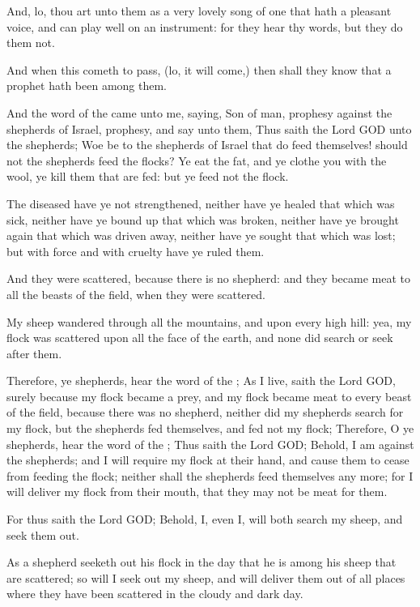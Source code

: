 \Verse And, lo, thou art unto them as a very lovely song of one that hath a pleasant voice, and can play well on an instrument: for they hear thy words, but they do them not.

\Verse And when this cometh to pass, (lo, it will come,) then shall they know that a prophet hath been among them.


\Chapter
\Verse And the word of the \LORD came unto me, saying, \Verse Son of man, prophesy against the shepherds of Israel, prophesy, and say unto them, Thus saith the Lord GOD unto the shepherds; Woe be to the shepherds of Israel that do feed themselves! should not the shepherds feed the flocks?  \Verse Ye eat the fat, and ye clothe you with the wool, ye kill them that are fed: but ye feed not the flock.

\Verse The diseased have ye not strengthened, neither have ye healed that which was sick, neither have ye bound up that which was broken, neither have ye brought again that which was driven away, neither have ye sought that which was lost; but with force and with cruelty have ye ruled them.

\Verse And they were scattered, because there is no shepherd: and they became meat to all the beasts of the field, when they were scattered.

\Verse My sheep wandered through all the mountains, and upon every high hill: yea, my flock was scattered upon all the face of the earth, and none did search or seek after them.

\Verse Therefore, ye shepherds, hear the word of the \LORD; \Verse As I live, saith the Lord GOD, surely because my flock became a prey, and my flock became meat to every beast of the field, because there was no shepherd, neither did my shepherds search for my flock, but the shepherds fed themselves, and fed not my flock; \Verse Therefore, O ye shepherds, hear the word of the \LORD; \Verse Thus saith the Lord GOD; Behold, I am against the shepherds; and I will require my flock at their hand, and cause them to cease from feeding the flock; neither shall the shepherds feed themselves any more; for I will deliver my flock from their mouth, that they may not be meat for them.

\Verse For thus saith the Lord GOD; Behold, I, even I, will both search my sheep, and seek them out.

\Verse As a shepherd seeketh out his flock in the day that he is among his sheep that are scattered; so will I seek out my sheep, and will deliver them out of all places where they have been scattered in the cloudy and dark day.

